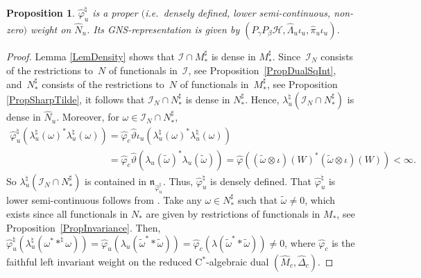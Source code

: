 \documentclass[11pt]{article}
\numberwithin{equation}{section}
\newtheorem{prop}[thm]{Proposition}
\theoremstyle{definition}
\newcommand{\cHil}{\mathcal{H}}
\begin{document}
\begin{prop}\label{PropNSFWeightCast}
$\hat{\varphi}_u^\natural $ is a proper $($i.e.\ densely defined, lower semi-continuous, non-zero$)$ weight on $\hat{N}_u$. Its GNS-representation is given by  $(P_\gamma P_\beta \cHil, \hat{\Lambda}_{u}  \iota_u, \hat{\pi}_{u}  \iota_u )$.
\end{prop}
\begin{proof}
Lemma \ref{LemDensity} shows that  $\mathcal{I} \cap M_\ast^\sharp$ is dense in $M_\ast^\sharp$.
Since~$\mathcal{I}_N$ consists of the restrictions to~$N$ of functionals in~$\mathcal{I}$, see Proposition~\ref{PropDualSqInt}, and~$N_\ast^\sharp$ consists of the restrictions to~$N$ of functionals in~$M_\ast^\sharp$, see Proposition \ref{PropSharpTilde}, it follows that $\mathcal{I}_N \cap N_\ast^\sharp$ is dense in $N_\ast^\sharp$. Hence, $\lambda_u^\natural(\mathcal{I}_N \cap N_\ast^\sharp)$ is dense in $\hat{N}_u$. Moreover, for $\omega \in \mathcal{I}_N \cap N_\ast^\sharp$,
\begin{gather*}
 \hat{\varphi}^\natural_u(\lambda_u^\natural(\omega)^\ast\lambda_u^\natural(\omega) ) = \hat{\varphi}_c \hat{\vartheta} \iota_u (\lambda_u^\natural(\omega)^\ast\lambda_u^\natural(\omega) )
\\
\phantom{\hat{\varphi}^\natural_u(\lambda_u^\natural(\omega)^\ast\lambda_u^\natural(\omega) )}{}
=  \hat{\varphi}_c \hat{\vartheta} (\lambda_u(\tilde{\omega})^\ast\lambda_u(\tilde{\omega}) ) = \hat{\varphi}( (\tilde{\omega} \otimes \iota)(W)^\ast (\tilde{\omega} \otimes \iota)(W) )
< \infty .
\end{gather*}
So   $\lambda_u^\natural(\mathcal{I}_N \cap N_\ast^\sharp)$ is contained in $\mathfrak{n}_{\hat{\varphi}_u^\natural}$. Thus, $\hat{\varphi}^\natural_u$ is densely def\/ined.
 That $\hat{\varphi}_u^\natural $ is lower semi-continuous follows from \cite[Def\/inition~1.5]{KusVae}. Take any $\omega \in N_\ast^\sharp$ such that $\tilde{\omega} \not = 0$, which exists since all functionals in $N_\ast$ are given by restrictions of functionals in $M_\ast$, see Proposition~\ref{PropInvariance}. Then, $\hat{\varphi}_u^\natural ( \lambda_u^\natural( \omega^\ast \ast^\natural \omega) ) = \hat{\varphi}_u( \lambda_u (\tilde{\omega}^\ast \ast \tilde{\omega}) ) = \hat{\varphi}_c(\lambda(\tilde{\omega}^\ast \ast \tilde{\omega})) \not = 0 $, where $\hat{\varphi}_c$ is the faithful left invariant weight on the reduced C$^\ast$-algebraic dual $(\hat{M}_c, \hat{\Delta}_c)$.


\end{proof}
\end{document}

